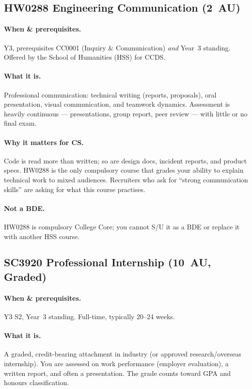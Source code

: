 \subsection{HW0288 Engineering Communication (2~AU)}
\paragraph{When \& prerequisites.} Y3, prerequisites CC0001 (Inquiry \& Communication) \emph{and} Year~3 standing. Offered by the School of Humanities (HSS) for CCDS.

\paragraph{What it is.} Professional communication: technical writing (reports, proposals), oral presentation, visual communication, and teamwork dynamics. Assessment is heavily continuous --- presentations, group report, peer review --- with little or no final exam.

\paragraph{Why it matters for CS.} Code is read more than written; so are design docs, incident reports, and product specs. HW0288 is the only compulsory course that grades your ability to explain technical work to mixed audiences. Recruiters who ask for ``strong communication skills'' are asking for what this course practises.

\paragraph{Not a BDE.} HW0288 is compulsory College Core; you cannot S/U it as a BDE or replace it with another HSS course.

\subsection{SC3920 Professional Internship (10~AU, Graded)}
\paragraph{When \& prerequisites.} Y3 S2, Year~3 standing. Full-time, typically 20--24 weeks.

\paragraph{What it is.} A graded, credit-bearing attachment in industry (or approved research/overseas internship). You are assessed on work performance (employer evaluation), a written report, and often a presentation. The grade counts toward GPA and honours classification.

